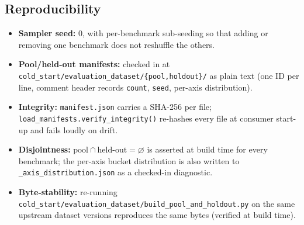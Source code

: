 \subsection{Reproducibility}
\label{app:bench-repro}

\begin{itemize}
  \item \textbf{Sampler seed:} $0$, with per-benchmark sub-seeding so
        that adding or removing one benchmark does not reshuffle the
        others.
  \item \textbf{Pool/held-out manifests:} checked in at
        \texttt{cold\_start/evaluation\_dataset/\{pool,holdout\}/} as
        plain text (one ID per line, comment header records
        \texttt{count}, \texttt{seed}, per-axis distribution).
  \item \textbf{Integrity:} \texttt{manifest.json} carries a SHA-256
        per file; \texttt{load\_manifests.verify\_integrity()}
        re-hashes every file at consumer start-up and fails loudly on
        drift.
  \item \textbf{Disjointness:} $\text{pool}\cap\text{held-out}=\varnothing$
        is asserted at build time for every benchmark; the per-axis
        bucket distribution is also written to
        \texttt{\_axis\_distribution.json} as a checked-in diagnostic.
  \item \textbf{Byte-stability:} re-running
        \texttt{cold\_start/evaluation\_dataset/build\_pool\_and\_holdout.py}
        on the same upstream dataset versions reproduces the same
        bytes (verified at build time).
\end{itemize}
